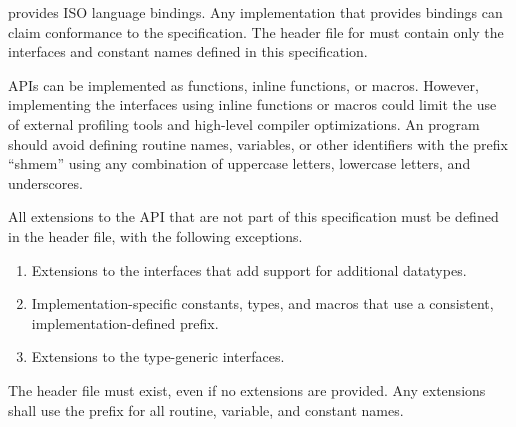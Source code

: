 \openshmem provides ISO \Cstd language bindings. Any implementation that
provides \Cstd bindings can claim conformance to the specification. The
\openshmem header file  for \Cstd must contain only the
interfaces and constant names defined in this specification.

\openshmem \acp{API} can be implemented as functions, inline functions, or
macros. However, implementing the interfaces using inline functions or macros
could limit the use of external profiling tools and high-level compiler
optimizations. An \openshmem program should avoid defining routine names,
variables, or other identifiers with the prefix ``shmem'' using any combination
of uppercase letters, lowercase letters, and underscores.

All extensions to the \openshmem \ac{API} that are not part of this
specification must be defined in the  header file, with the
following exceptions.

\begin{enumerate}
    \item Extensions to the \openshmem interfaces that add support for
        additional datatypes.
    \item Implementation-specific constants, types, and macros that use a
        consistent, implementation-defined prefix.
    \item Extensions to the type-generic interfaces.
\end{enumerate}

The 
header file must exist, even if no extensions are provided. Any extensions
shall use the  prefix for all routine, variable, and constant
names.
